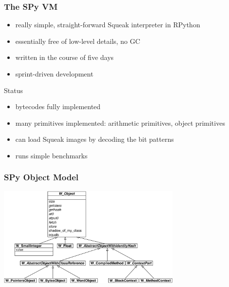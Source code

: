 \documentclass[utf8x]{beamer}
\begin{document}
\begin{frame}
    \frametitle{The SPy VM}
    \begin{itemize}
        \item really simple, straight-forward Squeak interpreter in RPython
        \item essentially free of low-level details, no GC
        \item written in the course of five days
        \item sprint-driven development
    \end{itemize}
    \pause
    \begin{block} {Status}
        \begin{itemize}
        \item bytecodes fully implemented
        \item many primitives implemented: arithmetic primitives, object primitives
        \item can load Squeak images by decoding the bit patterns
        \item runs simple benchmarks
        \end{itemize}
    \end{block}
\end{frame}

\begin{frame}
    \frametitle{SPy Object Model}
    \includegraphics[height=5cm]{objmodel}
\end{frame}
\end{document}
